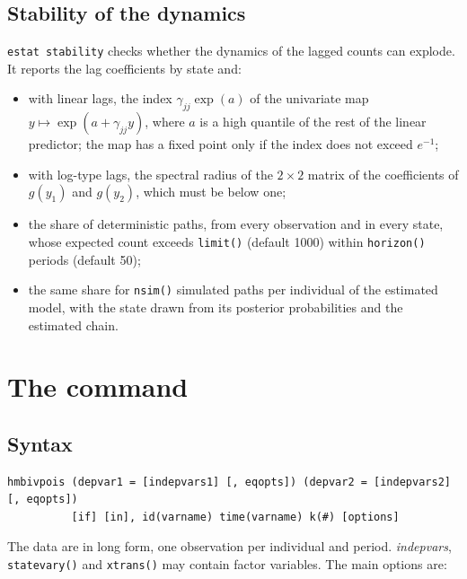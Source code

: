 \documentclass[11pt,a4paper]{article}
\newcommand{\cmd}[1]{\texttt{#1}}
\begin{document}
\subsection{Stability of the dynamics}\label{sec:stability}

\cmd{estat stability} checks whether the dynamics of the lagged counts can explode. It reports the lag
coefficients by state and:
\begin{itemize}
\item with linear lags, the index $\gamma_{jj}\exp(a)$ of the univariate map $y\mapsto\exp(a+\gamma_{jj}y)$,
where $a$ is a high quantile of the rest of the linear predictor; the map has a fixed point only if the
index does not exceed $e^{-1}$;
\item with log-type lags, the spectral radius of the $2\times2$ matrix of the coefficients of
$g(y_1)$ and $g(y_2)$, which must be below one;
\item the share of deterministic paths, from every observation and in every state, whose expected count
exceeds \cmd{limit()} (default 1000) within \cmd{horizon()} periods (default 50);
\item the same share for \cmd{nsim()} simulated paths per individual of the estimated model, with the
state drawn from its posterior probabilities and the estimated chain.
\end{itemize}

\section{The command}\label{sec:command}

\subsection{Syntax}

\begin{lstlisting}
hmbivpois (depvar1 = [indepvars1] [, eqopts]) (depvar2 = [indepvars2] [, eqopts])
          [if] [in], id(varname) time(varname) k(#) [options]
\end{lstlisting}

The data are in long form, one observation per individual and period. \textit{indepvars},
\cmd{statevary()} and \cmd{xtrans()} may contain factor variables. The main options are:
\end{document}
